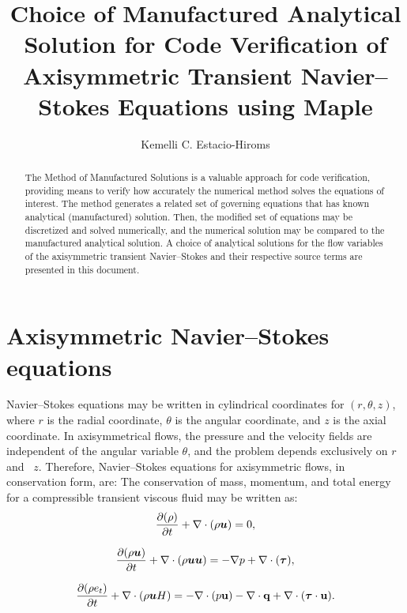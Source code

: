 \documentclass[10pt]{article}
\title{Choice of Manufactured Analytical Solution for Code Verification of Axisymmetric Transient Navier--Stokes Equations using Maple}
\author{Kemelli C. Estacio-Hiroms}
\newcommand{\bv}[1]{\ensuremath{\mbox{\boldmath$ #1 $}}}
\newcommand{\Diff}[2] {\dfrac{\partial( #1)}{\partial #2}}
\begin{document}
 
\maketitle

\begin{abstract}
The Method of Manufactured Solutions is a valuable approach for code verification, providing means to verify how accurately the numerical method solves the equations of interest. The method generates a related set of governing equations that has known analytical (manufactured) solution. Then, the modified set of equations may be discretized and solved numerically, and the numerical solution may be compared to the manufactured analytical solution. A choice of analytical solutions for the flow variables of the axisymmetric transient Navier--Stokes and their respective source terms are presented in this document.
\end{abstract}

\section{Axisymmetric Navier--Stokes equations}

Navier--Stokes equations may be written in cylindrical coordinates for $(r,\theta,z)$, where $r$ is the radial coordinate, $\theta$ is the angular coordinate, and $z$ is the axial coordinate. In axisymmetrical flows, the pressure and the velocity fields are independent of the angular variable $\theta$, and the problem depends exclusively on $r$ and~ $z$. Therefore, Navier--Stokes equations for axisymmetric flows, in conservation form,  are:
The conservation of mass, momentum, and total energy for a compressible transient viscous fluid may be written as:
\begin{equation}
 \label{eq:euler_01}
\Diff{\rho}{t}+ \nabla \cdot \left(\rho \bv{u}\right) = 0,
\end{equation}

\begin{equation}
 \label{eq:euler_02}
\Diff{\rho \bv{u}}{t} +\nabla\cdot\left(\rho\bv{u}\bv{u}\right) = -\nabla p+  \nabla \cdot (\bv{\tau} ),
\end{equation}

\begin{equation}
 \label{eq:euler_03}
\Diff{\rho e_t}{ t}+\nabla\cdot\left(\rho \bv{u} H\right) =-   \nabla\cdot(p  \mathbf{u}) -\nabla\cdot \mathbf{q} +  \nabla \cdot (\bv{\tau} \cdot \mathbf{u}).
\end{equation}
%
\end{document}
